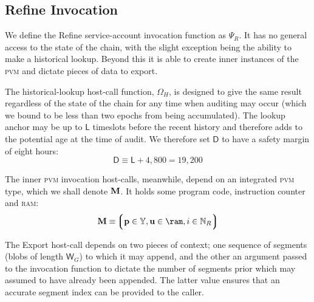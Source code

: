 \subsection{Refine Invocation}\label{sec:refineinvocation}

We define the Refine service-account invocation function as $\Psi_R$. It has no general access to the state of the \Jam chain, with the slight exception being the ability to make a historical lookup. Beyond this it is able to create inner instances of the \textsc{pvm} and dictate pieces of data to export.

The historical-lookup host-call function, $\Omega_H$, is designed to give the same result regardless of the state of the chain for any time when auditing may occur (which we bound to be less than two epochs from being accumulated). The lookup anchor may be up to $\mathsf{L}$ timeslots before the recent history and therefore adds to the potential age at the time of audit. We therefore set $\mathsf{D}$ to have a safety margin of eight hours:
\begin{equation}
  \mathsf{D} \equiv \mathsf{L} + 4,800 = 19,200
\end{equation}

The inner \textsc{pvm} invocation host-calls, meanwhile, depend on an integrated \textsc{pvm} type, which we shall denote $\mathbf{M}$. It holds some program code, instruction counter and \textsc{ram}:
\begin{equation}
  \pvm \equiv \tuple{\isa{\mathbf{p}}{\blob}, \isa{\mathbf{u}}{\ram}, \isa{i}{\pvmreg}}
\end{equation}

The Export host-call depends on two pieces of context; one sequence of segments (blobs of length $\mathsf{W}_G$) to which it may append, and the other an argument passed to the invocation function to dictate the number of segments prior which may assumed to have already been appended. The latter value ensures that an accurate segment index can be provided to the caller.

